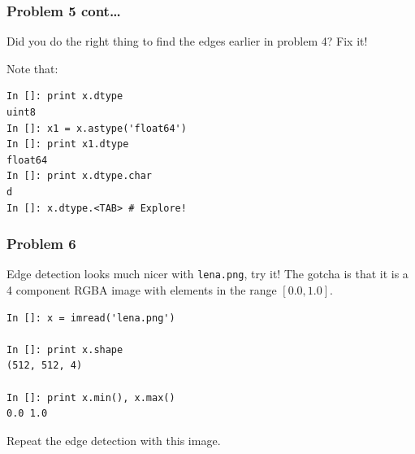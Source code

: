 \documentclass[14pt,compress]{beamer}
\newcommand{\typ}[1]{\lstinline{#1}}
\begin{document}
\begin{frame}[fragile]
  \frametitle{Problem 5 cont\ldots}
  Did you do the right thing to find the edges earlier in problem 4? Fix it! 
  
  Note that:
\begin{lstlisting}
In []: print x.dtype
uint8
In []: x1 = x.astype('float64')
In []: print x1.dtype
float64
In []: print x.dtype.char
d
In []: x.dtype.<TAB> # Explore!
\end{lstlisting}
\end{frame}

\begin{frame}[fragile]
  \frametitle{Problem 6}

  Edge detection looks much nicer with \typ{lena.png}, try it!  The
  gotcha is that it is a 4 component RGBA image with elements in the
  range $[0.0, 1.0]$.

\begin{lstlisting}
In []: x = imread('lena.png')

In []: print x.shape
(512, 512, 4)

In []: print x.min(), x.max()
0.0 1.0
\end{lstlisting}

 Repeat the edge detection with this image.

\end{frame}
\end{document}
